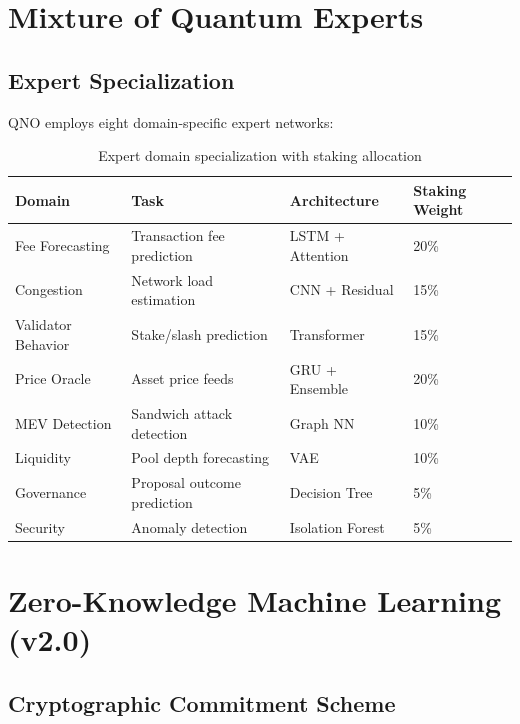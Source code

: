 \documentclass[11pt,a4paper]{article}
\begin{document}
\section{Mixture of Quantum Experts}

\subsection{Expert Specialization}

QNO employs eight domain-specific expert networks:

\begin{table}[h]
\centering
\begin{tabular}{llll}
\toprule
\textbf{Domain} & \textbf{Task} & \textbf{Architecture} & \textbf{Staking Weight} \\
\midrule
Fee Forecasting & Transaction fee prediction & LSTM + Attention & 20\% \\
Congestion & Network load estimation & CNN + Residual & 15\% \\
Validator Behavior & Stake/slash prediction & Transformer & 15\% \\
Price Oracle & Asset price feeds & GRU + Ensemble & 20\% \\
MEV Detection & Sandwich attack detection & Graph NN & 10\% \\
Liquidity & Pool depth forecasting & VAE & 10\% \\
Governance & Proposal outcome prediction & Decision Tree & 5\% \\
Security & Anomaly detection & Isolation Forest & 5\% \\
\bottomrule
\end{tabular}
\caption{Expert domain specialization with staking allocation}
\end{table}

\section{Zero-Knowledge Machine Learning (v2.0)}

\subsection{Cryptographic Commitment Scheme}
\end{document}
